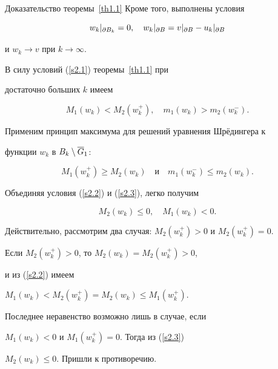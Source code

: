 \begin{pf*}{Доказательство теоремы~\ref{th1.1}}
Кроме того, выполнены условия


$$


w_k|_{\d{B_k}}=0,\quad 


w_k|_{\d{B}}=v|_{\d{B}}-u_k|_{\d{B}}


$$


и $w_k\to v$ при $k\to\infty$.





В силу условий (\ref{s2.1}) теоремы~\ref{th1.1} при


достаточно больших $k$ имеем


\begin{equation}


M_1(w_k)<M_2(w_k^+),\quad m_1(w_k)>m_2(w_k^-).


\label{s2.2}


\end{equation}


Применим принцип максимума для решений уравнения Шр\"едингера к


функции $w_k$ в $B_k\setminus\overline{G}_1$: 


\begin{equation}


M_1(w_k^+)\geq M_2(w_k)\quad \text{и} \quad m_1(w_k^-)\leq m_2(w_k).


\label{s2.3}


\end{equation}


Объединяя условия (\ref{s2.2}) и (\ref{s2.3}), легко получим


\begin{equation}


M_2(w_k)\leq0,\quad M_1(w_k)<0.


\label{s2.4}


\end{equation}





Действительно, рассмотрим два случая: $M_2(w_k^+)>0$ и $M_2(w_k^+)=0$.


Если $M_2(w_k^+)>0$, то $M_2(w_k)=M_2(w_k^+)>0$,


и из (\ref{s2.2}) имеем


$M_1(w_k)<M_2(w_k^+)=M_2(w_k)\leq M_1(w_k^+)$.


Последнее неравенство возможно лишь в случае, если


$M_1(w_k)<0$ и $M_1(w_k^+)=0$. Тогда из (\ref{s2.3})


$M_2(w_k)\leq 0$. Пришли к противоречию.






\end{pf*}

